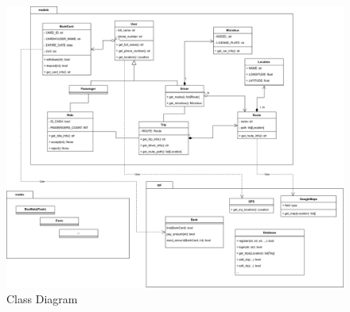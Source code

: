\documentclass{BusMateSRS}
\begin{document}
\begin{figure}[h!]
  \begin{center}
    \includegraphics[width=\columnwidth]{drawings/class-diagram.drawio.png}
  \end{center}
  \caption{Class Diagram}
  \label{fig:class-diagram}
\end{figure}





\end{document}
